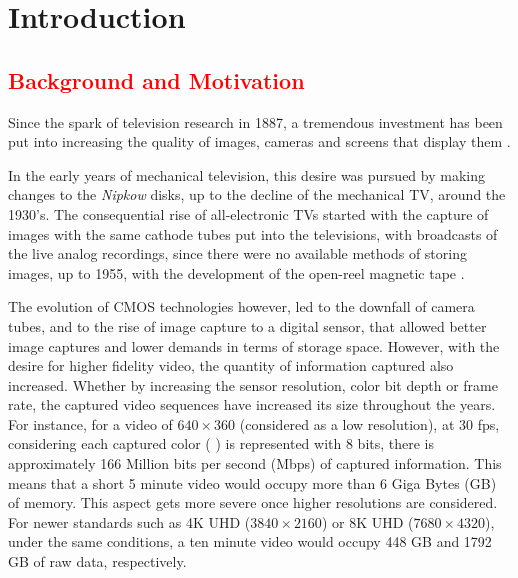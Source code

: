 \cleardoublepage
{}
\chapter{Introduction}

\section{\textcolor{red}{Background and Motivation}}

Since the spark of television research in 1887, a tremendous investment has been put into increasing the quality of images, cameras and screens that display them \cite{schubinWhatSparkedVideo2017}.

In the early years of mechanical television, this desire was pursued by making changes to the \textit{Nipkow} disks, up to the decline of the mechanical TV, around the 1930's. The consequential rise of all-electronic TVs started with the capture of images with the same cathode tubes put into the televisions, with broadcasts of the live analog recordings, since there were no available methods of storing images, up to 1955, with the development of the open-reel magnetic tape \cite{jacobsBriefHistoryVideo}.

The evolution of \Gls{CMOS} technologies however, led to the downfall of camera tubes, and to the rise of image capture to a digital sensor, that allowed better image captures and lower demands in terms of storage space. However, with the desire for higher fidelity video, the quantity of information captured also increased. Whether by increasing the sensor resolution, color bit depth or frame rate, the captured video sequences have increased its size throughout the years. For instance, for a video of $640 \times 360$ (considered as a low resolution), at 30 \gls{fps}, considering each captured color (
) is represented with 8 bits, there is approximately 166 Million bits per second (Mbps) of captured information. This means that a short 5 minute video would occupy more than 6 Giga Bytes (GB) of memory. This aspect gets more severe once higher resolutions are considered. For newer standards such as 4K \Gls{UHD} ($3840 \times 2160$) or 8K UHD ($ 7680 \times 4320$), under the same conditions, a ten minute video would occupy 448 GB and 1792 GB of raw data, respectively.

